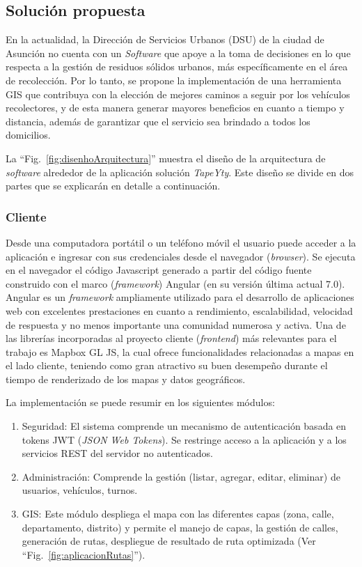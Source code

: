 \documentclass[spanish, conference]{IEEEtran}
\begin{document}
\subsection{Solución propuesta}

En la actualidad, la Dirección de Servicios Urbanos (DSU) de la ciudad de Asunción no cuenta con un \textit{Software} que apoye a la toma de decisiones en lo que respecta a la gestión de residuos sólidos urbanos, más específicamente en el área de recolección. Por lo tanto, se propone la implementación de una herramienta GIS que contribuya con la elección de mejores caminos a seguir por los vehículos recolectores, y de esta manera generar mayores beneficios en cuanto a tiempo y distancia, además de garantizar que el servicio sea brindado a todos los domicilios.

La ``Fig.~\ref{fig:disenhoArquitectura}'' muestra el diseño de la arquitectura de \textit{software} alrededor de la aplicación solución \textit{TapeYty}. Este diseño se divide en dos partes que se explicarán en detalle a continuación.

\subsubsection{Cliente}

Desde una computadora portátil o un teléfono móvil el usuario puede acceder a la aplicación e ingresar con sus credenciales desde el navegador (\textit{browser}). Se ejecuta en el navegador el código Javascript generado a partir del código fuente construido con el marco (\textit{framework}) Angular (en su versión última actual 7.0). Angular es un \textit{framework} ampliamente utilizado para el desarrollo de aplicaciones web con excelentes prestaciones en cuanto a rendimiento, escalabilidad, velocidad de respuesta y no menos importante una comunidad numerosa y activa. Una de las librerías incorporadas al proyecto cliente (\textit{frontend}) más relevantes para el trabajo es Mapbox GL JS, la cual ofrece funcionalidades relacionadas a mapas en el lado cliente, teniendo como gran atractivo su buen desempeño durante el tiempo de renderizado de los mapas y datos geográficos.

La implementación se puede resumir en los siguientes módulos:
\begin{enumerate}
    \item Seguridad: El sistema comprende un mecanismo de autenticación basada en tokens JWT (\textit{JSON Web Tokens}). Se restringe acceso a la aplicación y a los servicios REST del servidor no autenticados.
    \item Administración: Comprende la gestión (listar, agregar, editar, eliminar) de usuarios, vehículos, turnos.
    \item GIS: Este módulo despliega el mapa con las diferentes capas (zona, calle, departamento, distrito) y permite el manejo de capas, la gestión de calles, generación de rutas, despliegue de resultado de ruta optimizada (Ver ``Fig.~\ref{fig:aplicacionRutas}'').
\end{enumerate}
\end{document}
